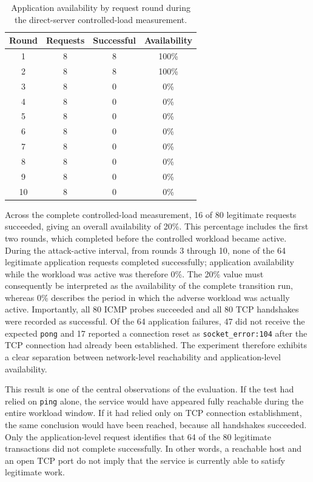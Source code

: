 \begin{table}[htbp]
\centering
\small
\begin{tabular}{cccc}
\toprule
\textbf{Round} & \textbf{Requests} & \textbf{Successful} & \textbf{Availability} \\
\midrule
1 & 8 & 8 & 100\% \\
2 & 8 & 8 & 100\% \\
3 & 8 & 0 & 0\% \\
4 & 8 & 0 & 0\% \\
5 & 8 & 0 & 0\% \\
6 & 8 & 0 & 0\% \\
7 & 8 & 0 & 0\% \\
8 & 8 & 0 & 0\% \\
9 & 8 & 0 & 0\% \\
10 & 8 & 0 & 0\% \\
\bottomrule
\end{tabular}
\caption{Application availability by request round during the direct-server controlled-load measurement.}
\label{tab:availability-rounds}
\end{table}

Across the complete controlled-load measurement, 16 of 80 legitimate requests
succeeded, giving an overall availability of 20\%. This percentage includes the
first two rounds, which completed before the controlled workload became active.
During the attack-active interval, from rounds 3 through 10, none of the 64
legitimate application requests completed successfully; application
availability while the workload was active was therefore 0\%. The 20\% value
must consequently be interpreted as the availability of the complete transition
run, whereas 0\% describes the period in which the adverse workload was
actually active. Importantly, all 80 ICMP probes succeeded and all 80 TCP
handshakes were recorded as successful. Of the 64 application failures, 47 did
not receive the expected \texttt{pong} and 17 reported a connection reset as
\texttt{socket\_error:104} after the TCP connection had already been
established. The experiment therefore exhibits a
clear separation between network-level reachability and application-level
availability.

This result is one of the central observations of the evaluation. If the test
had relied on \texttt{ping} alone, the service would have appeared fully
reachable during the entire workload window. If it had relied only on TCP
connection establishment, the same conclusion would have been reached, because
all handshakes succeeded. Only the application-level request identifies that 64
of the 80 legitimate transactions did not complete successfully. In other
words, a reachable host and an open TCP port do not imply that the service is
currently able to satisfy legitimate work.

